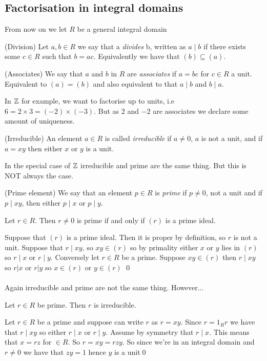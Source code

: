 \documentclass{article}
\begin{document}
\begin{itemize}
\subsection{Factorisation in integral domains}
From now on we let $ R $ be a general integral domain
\begin{definition}
	(Division) Let $ a,b\in R $ we say that a \textit{divides} b, written as $ a\mid b $ if there exists some $ c \in R $ such that $ b=ac $. Equivalently we have that $ (b)\subseteq (a) $.
\end{definition}
\begin{definition}
	(Associates) We say that $ a $ and $ b $ in $ R $ are \textit{associates} if $ a=bc $ for $ c\in R $ a unit. Equivalent to $ (a)=(b) $ and also equivalent to that $ a\mid b $ and $ b\mid a $.
\end{definition}
In $ \mathbb{Z} $ for example, we want to factorise up to units, i.e $ 6=2\times 3 = (-2)\times (-3) $. But as $ 2 $ and $ -2 $ are associates we declare some amount of uniqueness.
\begin{definition}
	(Irreducible) An element $ a\in R $ is called \textit{irreducible} if $ a\ne 0 $, $ a $ is not a unit, and if $ a=xy $ then either $ x $ or $ y $ is a unit.
\end{definition}
In the special case of $ \mathbb{Z} $ irreducible and prime are the same thing. But this is NOT always the case.
\begin{definition}
	(Prime element) We say that an element $ p\in R $ is \textit{prime} if $ p\ne 0 $, not a unit and if $ p\mid xy $, then either $ p\mid x $ or $ p\mid y $.
\end{definition}
\begin{proposition}
  Let $ r\in R $. Then $ r\ne 0 $ is prime if and only if $ (r) $ is a prime ideal.
\end{proposition}
\pf Suppose that $ (r) $ is a prime ideal. Then it is proper by definition, so $ r $ is not a unit. Suppose that $ r\mid xy $, so $ xy\in (r) $ so by primality either $ x $ or $ y $ lies in $ (r) $ so $ r\mid x $ or $ r\mid y $.
Conversely let $ r\in R $ be a prime. Suppose $ xy\in (r) $ then $ r\mid xy $ so $ r|x $ or $ r|y $ so $ x\in (r) $ or $ y\in (r) $ \qed\\\\
Again irreducible and prime are not the same thing. However...
\begin{proposition}
  Let $ r\in R $ be prime. Then $ r $ is irreducible.
\end{proposition}
\pf Let $ r\in R $ be a prime and suppose can write $ r $ as $ r=xy $. Since $ r=1_Rr $ we have that $ r\mid xy $ so either $ r\mid x $ or $ r\mid y $. Assume by symmetry that $ r\mid x $. This means that $ x=rz $ for $ \in R $. So $ r=xy=rzy $. So since we're in an integral domain and $ r\ne 0 $ we have that $ zy=1 $ hence $ y $ is a unit\qed\\\\

\end{itemize}
\end{document}
